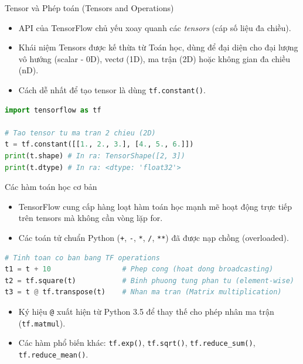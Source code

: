 \documentclass[aspectratio=169]{beamer}
\begin{document}
\begin{frame}[fragile]{Tensor và Phép toán (Tensors and Operations)}
    \begin{itemize}
        \item API của TensorFlow chủ yếu xoay quanh các \textit{tensors} (cáp số liệu đa chiều).
        \item Khái niệm Tensors được kế thừa từ Toán học, dùng để đại diện cho đại lượng vô hướng (scalar - 0D), vectơ (1D), ma trận (2D) hoặc không gian đa chiều (nD).
        \item Cách dễ nhất để tạo tensor là dùng \texttt{tf.constant()}.
    \end{itemize}
    \begin{lstlisting}[language=Python]
import tensorflow as tf

# Tao tensor tu ma tran 2 chieu (2D)
t = tf.constant([[1., 2., 3.], [4., 5., 6.]])
print(t.shape) # In ra: TensorShape([2, 3])
print(t.dtype) # In ra: <dtype: 'float32'>
    \end{lstlisting}
\end{frame}

\begin{frame}[fragile]{Các hàm toán học cơ bản}
    \begin{itemize}
        \item TensorFlow cung cấp hàng loạt hàm toán học mạnh mẽ hoạt động trực tiếp trên tensors mà không cần vòng lặp for.
        \item Các toán tử chuẩn Python (\texttt{+}, \texttt{-}, \texttt{*}, \texttt{/}, \texttt{**}) đã được nạp chồng (overloaded).
    \end{itemize}
    \begin{lstlisting}[language=Python]
# Tinh toan co ban bang TF operations
t1 = t + 10                 # Phep cong (hoat dong broadcasting)
t2 = tf.square(t)           # Binh phuong tung phan tu (element-wise)
t3 = t @ tf.transpose(t)    # Nhan ma tran (Matrix multiplication)
    \end{lstlisting}
    \begin{itemize}
        \item Ký hiệu \texttt{@} xuất hiện từ Python 3.5 để thay thế cho phép nhân ma trận (\texttt{tf.matmul}).
        \item Các hàm phổ biến khác: \texttt{tf.exp()}, \texttt{tf.sqrt()}, \texttt{tf.reduce\_sum()}, \texttt{tf.reduce\_mean()}.
    \end{itemize}
\end{frame}
\end{document}
